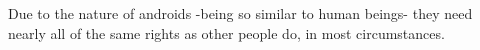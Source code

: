 Due to the nature of androids -being so similar to human beings- they need nearly all of the same rights as other people do, in most circumstances.
